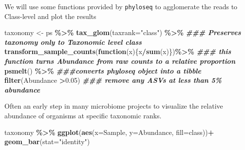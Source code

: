 \documentclass[
]{book}
\newenvironment{Shaded}{\begin{snugshade}}{\end{snugshade}}
\newcommand{\AttributeTok}[1]{\textcolor[rgb]{0.13,0.29,0.53}{#1}}
\newcommand{\ControlFlowTok}[1]{\textcolor[rgb]{0.13,0.29,0.53}{\textbf{#1}}}
\newcommand{\DocumentationTok}[1]{\textcolor[rgb]{0.56,0.35,0.01}{\textbf{\textit{#1}}}}
\newcommand{\FloatTok}[1]{\textcolor[rgb]{0.00,0.00,0.81}{#1}}
\newcommand{\FunctionTok}[1]{\textcolor[rgb]{0.13,0.29,0.53}{\textbf{#1}}}
\newcommand{\NormalTok}[1]{#1}
\newcommand{\OtherTok}[1]{\textcolor[rgb]{0.56,0.35,0.01}{#1}}
\newcommand{\SpecialCharTok}[1]{\textcolor[rgb]{0.81,0.36,0.00}{\textbf{#1}}}
\newcommand{\StringTok}[1]{\textcolor[rgb]{0.31,0.60,0.02}{#1}}
\begin{document}
We will use some functions provided by \texttt{phyloseq} to agglomerate the reads to Class-level and plot the results

\begin{Shaded}
\begin{Highlighting}[]
\NormalTok{taxonomy }\OtherTok{\textless{}{-}}\NormalTok{ ps }\SpecialCharTok{\%\textgreater{}\%} 
  \FunctionTok{tax\_glom}\NormalTok{(}\AttributeTok{taxrank=}\StringTok{"class"}\NormalTok{) }\SpecialCharTok{\%\textgreater{}\%} \DocumentationTok{\#\#\# Preserves taxonomy only to Taxonomic level class}
  \FunctionTok{transform\_sample\_counts}\NormalTok{(}\ControlFlowTok{function}\NormalTok{(x)\{x}\SpecialCharTok{/}\FunctionTok{sum}\NormalTok{(x)\})}\SpecialCharTok{\%\textgreater{}\%} \DocumentationTok{\#\#\# this function turns Abundance from raw counts to a relative proportion}
  \FunctionTok{psmelt}\NormalTok{() }\SpecialCharTok{\%\textgreater{}\%} \DocumentationTok{\#\#\#converts phyloseq object into a tibble }
  \FunctionTok{filter}\NormalTok{(Abundance }\SpecialCharTok{\textgreater{}}\FloatTok{0.05}\NormalTok{) }\DocumentationTok{\#\#\# remove any ASVs at less than 5\% abundance}
\end{Highlighting}
\end{Shaded}

Often an early step in many microbiome projects to visualize the relative abundance of organisms at specific taxonomic ranks.

\begin{Shaded}
\begin{Highlighting}[]
\NormalTok{taxonomy }\SpecialCharTok{\%\textgreater{}\%} 
  \FunctionTok{ggplot}\NormalTok{(}\FunctionTok{aes}\NormalTok{(}\AttributeTok{x=}\NormalTok{Sample, }\AttributeTok{y=}\NormalTok{Abundance, }\AttributeTok{fill=}\NormalTok{class))}\SpecialCharTok{+}
  \FunctionTok{geom\_bar}\NormalTok{(}\AttributeTok{stat=}\StringTok{"identity"}\NormalTok{)}
\end{Highlighting}
\end{Shaded}
\end{document}
